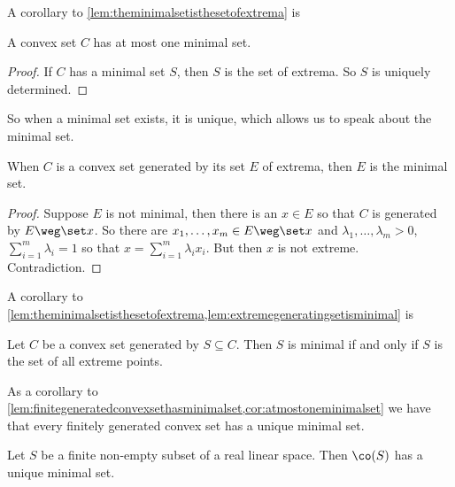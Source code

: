 \documentclass[12pt,a4paper]{article}
\begin{document}
A corollary to \cref{lem:theminimalsetisthesetofextrema} is 
\begin{corollary}\label{cor:atmostoneminimalset}
	A convex set $C$ has at most one minimal set. 
\end{corollary}
\begin{proof}
    If $C$ has a minimal set $S$, then $S$ is the set of extrema. So $S$ is uniquely determined.
\end{proof}
So when a minimal set exists, it is unique, which allows us to speak about the minimal set. 

\begin{lemma}\label{lem:extremegeneratingsetisminimal}
    When $C$ is a convex set generated by its set $E$ of extrema, then $E$ is the minimal set. 
\end{lemma}
\begin{proof}
    Suppose $E$ is not minimal, then there is an $x\in E$ so that $C$ is generated by $E\weg\set x$. So there are $x_1,\ldots,x_m\in E\weg \set x$ and $\lambda_1,\ldots,\lambda_m>0$, $\sum_{i=1}^m \lambda_i=1$ so that $x=\sum_{i=1}^m \lambda_ix_i$. But then $x$ is not extreme. Contradiction. 
\end{proof}

A corollary to \cref{lem:theminimalsetisthesetofextrema,lem:extremegeneratingsetisminimal} is 
\begin{corollary}\label{cor:characterisationofminimalsetsintermsofextremepointsandgenerating}
Let $C$ be a convex set generated by $S\subseteq C$. Then $S$ is minimal if and only if $S$ is the set of all extreme points.  
\end{corollary}

As a corollary to \cref{lem:finitegeneratedconvexsethasminimalset,cor:atmostoneminimalset} we have that every finitely generated convex set has a unique minimal set. 
\begin{corollary}
    Let $S$ be a finite non-empty subset of a real linear space. Then $\co(S)$ has a unique minimal set. 
\end{corollary}
\end{document}
